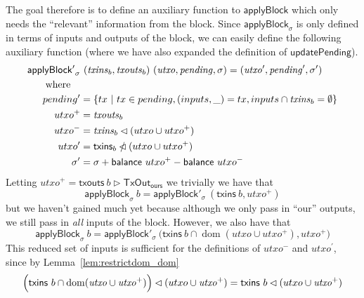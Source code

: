 \documentclass{article}
\newcommand{\restrictdom}{\lhd}
\newcommand{\subtractdom}{\mathbin{\slashed{\restrictdom}}}
\newcommand{\restrictrange}{\rhd}
\DeclareMathOperator{\dom}{dom}
\begin{document}
The goal therefore is to define an auxiliary function to $\mathsf{applyBlock}$
which only needs the ``relevant'' information from the block.
Since $\mathsf{applyBlock}_\sigma$ is only defined in terms of inputs and
outputs of the block, we can easily define the following auxiliary function
(where we have also expanded the definition of $\mathsf{updatePending}$).
%
\begin{equation*}
\begin{split}
\mathsf{applyBlock'}_\sigma & ~ (\mathit{txins}_b, \mathit{txouts}_b) ~ (\mathit{utxo}, \mathit{pending}, \sigma) = (\mathit{utxo}^\prime, \mathit{pending}^\prime, \sigma^\prime) \\
\text{where} \quad \\
    pending^\prime & = \{ tx ~|~ tx \in pending, (inputs, \_) = tx, inputs \cap \mathit{txins}_b = \emptyset \} \\
    utxo^+ & = \mathit{txouts}_b \\
    utxo^- & = \mathit{txins}_b \restrictdom (utxo \cup utxo^+) \\
    utxo^\prime & = \mathsf{txins}_b \subtractdom (utxo \cup utxo^+) \\
    \sigma^\prime & = \sigma + \mathsf{balance} ~ utxo^+ - \mathsf{balance} ~ utxo^- \\
\end{split}
\end{equation*}
%
Letting
%
\begin{math}
\mathit{utxo}^+ = \mathsf{txouts} ~ b \restrictrange \mathsf{TxOut_{ours}}
\end{math}
%
we trivially we have that
%
\begin{equation}
  \mathsf{applyBlock}_\sigma ~ b
= \mathsf{applyBlock}'_\sigma ~ (\mathsf{txins} ~ b, \mathit{utxo}^+)
\end{equation}
%
but we haven't gained much yet because although we only pass in ``our'' outputs,
we still pass in \emph{all} inputs of the block. However, we also have that
%
\begin{equation}
  \mathsf{applyBlock}_\sigma ~ b
= \mathsf{applyBlock}'_\sigma ~ \Big( \mathsf{txins} ~ b \cap \dom (\mathit{utxo} \cup \mathit{utxo}^+), \mathit{utxo}^+ \Bigr)
\end{equation}
%
This reduced set of inputs is sufficient for the definitions of
$\mathit{utxo}^-$ and $\mathit{utxo}^\prime$, since by
Lemma~\ref{lem:restrictdom_dom}
%
\begin{equation*}
  \Bigl( \mathsf{txins} ~ b \cap \dom (\mathit{utxo} \cup \mathit{utxo}^+) \Bigr) \restrictdom (utxo \cup \mathit{utxo}^+) \\
= \mathsf{txins} ~ b \restrictdom (utxo \cup \mathit{utxo}^+)
\end{equation*}
\end{document}
